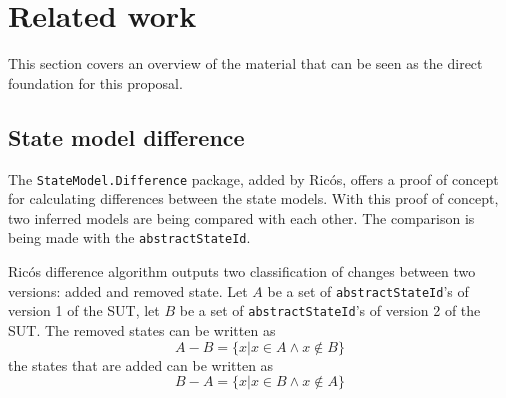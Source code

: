 \section{Related work} \label{releatedWork}
    
    This section covers an overview of the material that can be seen as the direct foundation for this proposal.
    
    
    
    

        
        
\subsection{State model difference}
The \verb|StateModel.Difference| package, added by Ricós\cite{stateDiff}, offers a proof of concept for calculating differences between the state models. With this proof of concept, two inferred models are being compared with each other. The comparison is being made with the \verb|abstractStateId|. 

Ricós difference algorithm\cite{stateDiff} outputs two classification of changes between two versions: added and removed state. Let $A$ be a set of \verb|abstractStateId|'s of version 1 of the SUT, let $B$ be a set of \verb|abstractStateId|'s of version 2 of the SUT. The removed states can be written as
\[A-B = \lbrace x | x \in A \wedge x \notin B \rbrace\]
the states that are added can be written as
\[B-A = \lbrace x | x \in B \wedge x \notin A \rbrace\]


